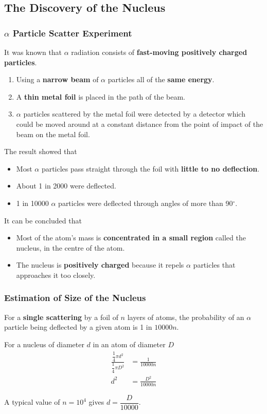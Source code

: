 \subsection{The Discovery of the Nucleus}

\subsubsection*{$\alpha$ Particle Scatter Experiment}

It was known that $\alpha$ radiation consists of \textbf{fast-moving positively charged particles}.
\begin{enumerate}
    \item Using a \textbf{narrow beam} of $\alpha$ particles all of the \textbf{same energy}.
    \item A \textbf{thin metal foil} is placed in the path of the beam.
    \item $\alpha$ particles scattered by the metal foil were detected by a detector which could be moved around at a constant distance from the point of impact of the beam on the metal foil.
\end{enumerate}

The result showed that
\begin{itemize}
    \item Most $\alpha$ particles pass straight through the foil with \textbf{little to no deflection}.
    \item About 1 in 2000 were deflected.
    \item 1 in 10000 $\alpha$ particles were deflected through angles of more than 90$^\circ$.
\end{itemize}

It can be concluded that
\begin{itemize}
    \item Most of the atom's mass is \textbf{concentrated in a small region} called the nucleus, in the centre of the atom.
    \item The nucleus is \textbf{positively charged} because it repels $\alpha$ particles that approaches it too closely.
\end{itemize}

\subsubsection*{Estimation of Size of the Nucleus}

For a \textbf{single scattering} by a foil of $n$ layers of atoms, the probability of an $\alpha$ particle being deflected by a given atom is 1 in $10000n$.

For a nucleus of diameter $d$ in an atom of diameter $D$
\begin{align*}
    \frac{\dfrac{1}{4}\pi d^2}{\dfrac{1}{4}\pi D^2}&=\frac{1}{10000n}\\
    d^2&=\frac{D^2}{10000n}
\end{align*}

A typical value of $n=10^{4}$ gives $d=\dfrac{D}{10000}$.
